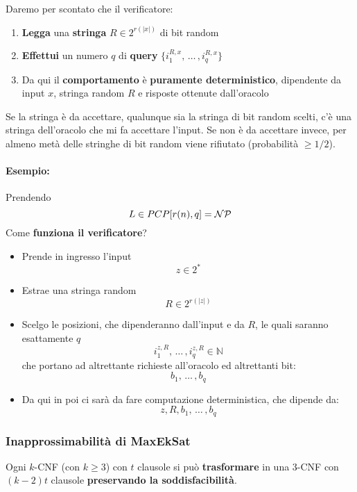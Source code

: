 Daremo per scontato che il verificatore: 
\begin{enumerate}
	\item \textbf{Legga} una \textbf{stringa} $R \in 2^{r(|x|)}$ di bit random
	\item \textbf{Effettui} un numero $q$ di \textbf{query} $\{i_1^{R,x}, \, \dots \, , i_q^{R,x}\}$
	\item Da qui il \textbf{comportamento} è \textbf{puramente deterministico}, dipendente da input $x$, stringa random $R$ e risposte ottenute dall'oracolo
\end{enumerate}

Se la stringa è da accettare, qualunque sia la stringa di bit random scelti, c'è una stringa dell'oracolo che mi fa accettare l'input. Se non è da accettare invece, per almeno metà delle stringhe di bit random viene rifiutato (probabilità $\geq 1/2$).\\


\newpage

\paragraph{Esempio:} Prendendo 
$$ L \in PCP [r(n), q] = \mathcal{NP} $$
Come \textbf{funziona il verificatore}?
\begin{itemize}
	\item Prende in ingresso l'input 
	$$ z \in 2^\ast$$
	\item Estrae una stringa random
	$$ R \in 2^{r(|z|)} $$
	\item Scelgo le posizioni, che dipenderanno dall'input e da $R$, le quali saranno esattamente $q$
	$$ i_{1}^{z,R}, \, \dots \, , i_{q}^{z,R} \in \mathbb{N} $$
	che portano ad altrettante richieste all'oracolo ed altrettanti bit: 
	$$ b_1, \, \dots \, , b_q $$
	\item Da qui in poi ci sarà da fare computazione deterministica, che dipende da:
	$$ z, R, b_1, \, \dots \, , b_q $$
\end{itemize} 

\newpage

\subsubsection{Inapprossimabilità di MaxEkSat}
Ogni $k$-CNF (con $k \geq 3$) con $t$ clausole si può \textbf{trasformare} in una 3-CNF con $(k-2)t$ clausole \textbf{preservando la soddisfacibilità}.\\

